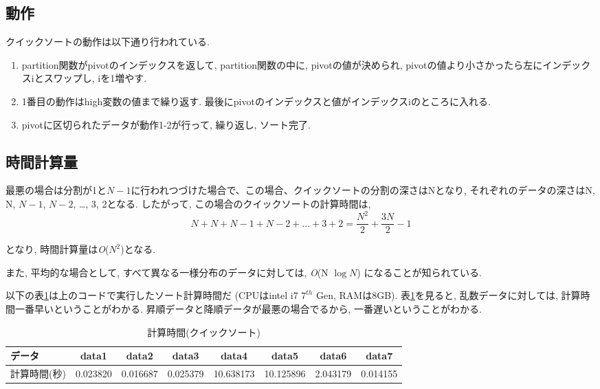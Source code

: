\documentclass[a4j, titlepage]{jarticle}
\begin{document}
\subsection{動作}
クイックソートの動作は以下通り行われている.
\begin{enumerate}
\item partition関数がpivotのインデックスを返して, partition関数の中に, pivotの値が決められ, pivotの値より小さかったら左にインデックスiとスワップし, iを1増やす. 
\item 1番目の動作はhigh変数の値まで繰り返す. 最後にpivotのインデックスと値がインデックスiのところに入れる. 
\item  pivotに区切られたデータが動作1-2が行って, 繰り返し, ソート完了.
\end{enumerate}
\subsection{時間計算量}
最悪の場合は分割が1と$N-1$に行われつづけた場合で、この場合、クイックソートの分割の深さはNとなり, それぞれのデータの深さはN, N, $N-1$, $N-2$, \dots, 3, 2となる. したがって, この場合のクイックソートの計算時間は, 
\begin{equation}
N + N + N-1 + N-2 + \dots + 3 + 2 = \frac{N^2}{2} + \frac{3N}{2} - 1
\end{equation}

となり, 時間計算量は\textit{O}($N^2$)となる.

また, 平均的な場合として, すべて異なる一様分布のデータに対しては, \textit{O}(N $\log N$) になることが知られている.

以下の表\ref{table:quick}は上のコードで実行したソート計算時間だ (CPUはintel i7 $7^{th}$ Gen, RAMは8GB). 
表\ref{table:quick}を見ると, 乱数データに対しては, 計算時間一番早いということがわかる. 昇順データと降順データが最悪の場合でるから, 一番遅いということがわかる.
\begin{table}[bth]
\label{table:quick}
\caption{計算時間(クイックソート)}
\begin{center}
\begin{tabular}{|l|ccccccc|}
\hline
データ & data1 & data2 &data3 &data4 &data5 &data6 &data7 \\ \hline
計算時間(秒) & 0.023820 & \cellcolor{green!20}0.016687 & 0.025379 & \cellcolor{red!20}10.638173 & 10.125896 & 2.043179 & 0.014155\\ \hline
\end{tabular}
\end{center}
\end{table} 
\pagebreak
\end{document}
